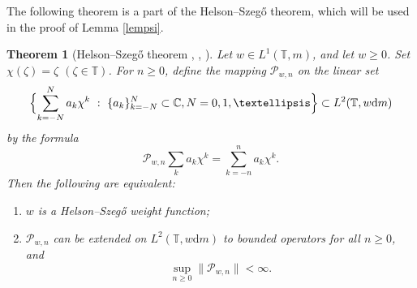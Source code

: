 \documentclass[a4paper,oneside,11pt]{amsart}
\numberwithin{equation}{section}
\theoremstyle{plain}
\newtheorem{theoremcite}{Theorem}
\theoremstyle{definition}
\begin{document}
The following theorem is a part of the Helson--Szeg\H o theorem, which will be used in the proof of Lemma \ref{lempsi}.

\begin{theoremcite}[Helson--Szeg\H o theorem
 {\cite[Theorem 2.1]{borsp}}, {\cite[Ch. VIII.6]{nik86}}, {\cite[Lemma I.A.5.2.5, Theorem I.A.5.4.1]{nik02}}]\label{thmhhss}
Let $w\in L^1(\mathbb T, m)$, and let $w\geq 0$. Set $\chi(\zeta)=\zeta$ $(\zeta\in\mathbb T)$. For $n\geq 0$, 
define the mapping $\mathcal P_{w,n}$ on the linear set 
$$\Bigl\{\sum_{k=-N}^N a_k \chi^k \ :\  \{a_k\}_{k=-N}^N\subset \mathbb C, N=0,1,\ldots\Bigr\}\subset 
L^2(\mathbb T, w\mathrm{d}m)$$ by the formula
 \begin{equation*}\mathcal P_{w,n}\sum_k a_k \chi^k = \sum_{k=-n}^n a_k \chi^k.\end{equation*}
Then the following are equivalent:
\begin{enumerate}[\upshape (i)]
\item $w$ is a Helson--Szeg\H o weight function;

\item $\mathcal P_{w,n}$ can be extended on $L^2(\mathbb T, w\mathrm{d}m)$ to bounded operators for all $n\geq 0$, and 
$$\sup_{n\geq 0}\|\mathcal P_{w,n}\|<\infty.$$
\end{enumerate}
\end{theoremcite}
\end{document}

